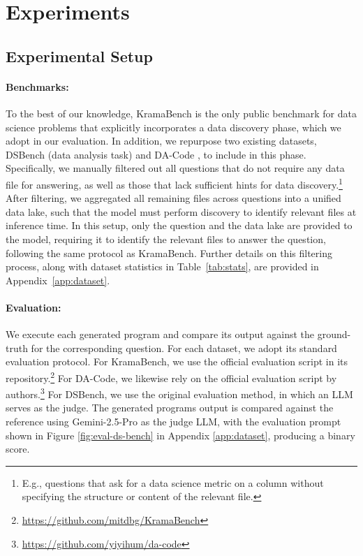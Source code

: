 \section{Experiments}

\subsection{Experimental Setup}
\label{sec:exp-setup}

\paragraph{Benchmarks:}


To the best of our knowledge, KramaBench is the only public benchmark for data science problems that explicitly incorporates a data discovery phase, which we adopt in our evaluation. In addition, we repurpose two existing datasets, DSBench (data analysis task) \citep{jing2025dsbench} and DA-Code \citep{huang-etal-2024-da}, to include in this phase. Specifically, we manually filtered out all questions that do not require any data file for answering, as well as those that lack sufficient hints for data discovery.\footnote{E.g., questions that ask for a data science metric on a column without specifying the structure or content of the relevant file.} After filtering, we aggregated all remaining files across questions into a unified data lake, such that the model must perform discovery to identify relevant files at inference time. In this setup, only the question and the data lake are provided to the model, requiring it to identify the relevant files to answer the question, following the same protocol as KramaBench. Further details on this filtering process, along with dataset statistics in Table~\ref{tab:stats}, are provided in Appendix~\ref{app:dataset}.


\paragraph{Evaluation:}

We execute each generated program and compare its output against the ground-truth for the corresponding question. For each dataset, we adopt its standard evaluation protocol. For KramaBench, we use the official evaluation script in its repository.\footnote{\url{https://github.com/mitdbg/KramaBench}} For DA-Code, we likewise rely on the official evaluation script by authors.\footnote{\url{https://github.com/yiyihum/da-code}} For DSBench, we use the original evaluation method, in which an LLM serves as the judge. The generated programs output is compared against the reference using Gemini-2.5-Pro as the judge LLM, with the evaluation prompt shown in Figure \ref{fig:eval-ds-bench} in Appendix \ref{app:dataset}, producing a binary score.

